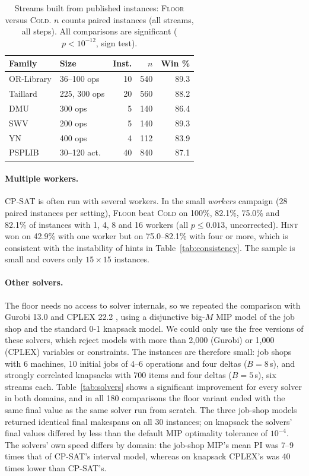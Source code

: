 \documentclass[letterpaper]{article} %
\newcommand{\mcold}{\textsc{Cold}}
\newcommand{\mhint}{\textsc{Hint}}
\newcommand{\mfloor}{\textsc{Floor}}
\begin{document}
\begin{table}[t]
\centering
\small
\setlength{\tabcolsep}{4pt}
\begin{tabular}{llrrr}
\toprule
Family & Size & Inst. & $n$ & Win \% \\
\midrule
OR-Library & 36--100 ops & 10 & 540 & 89.3 \\
Taillard & 225, 300 ops & 20 & 560 & 88.2 \\
DMU & 300 ops & 5 & 140 & 86.4 \\
SWV & 200 ops & 5 & 140 & 89.3 \\
YN & 400 ops & 4 & 112 & 83.9 \\
PSPLIB & 30--120 act. & 40 & 840 & 87.1 \\
\bottomrule
\end{tabular}
\caption{Streams built from published instances: \mfloor{} versus \mcold. $n$ counts paired instances (all streams, all steps). All comparisons are significant ($p < 10^{-12}$, sign test).}
\label{tab:real}
\end{table}

\paragraph{Multiple workers.} CP-SAT is often run with several workers. In the small \emph{workers} campaign (28 paired instances per setting), \mfloor{} beat \mcold{} on 100\%, 82.1\%, 75.0\% and 82.1\% of instances with 1, 4, 8 and 16 workers (all $p \le 0.013$, uncorrected). \mhint{} won on 42.9\% with one worker but on 75.0--82.1\% with four or more, which is consistent with the instability of hints in Table~\ref{tab:consistency}. The sample is small and covers only $15{\times}15$ instances.

\paragraph{Other solvers.} The floor needs no access to solver internals, so we repeated the comparison with Gurobi 13.0 \citep{gurobi} and CPLEX 22.2 \citep{cplex}, using a disjunctive big-$M$ MIP model of the job shop \citep{manne1960,ku2016} and the standard 0-1 knapsack model. We could only use the free versions of these solvers, which reject models with more than 2{,}000 (Gurobi) or 1{,}000 (CPLEX) variables or constraints. The instances are therefore small: job shops with 6 machines, 10 initial jobs of 4--6 operations and four deltas ($B=8$\,s), and strongly correlated knapsacks with 700 items and four deltas ($B=5$\,s), six streams each. Table~\ref{tab:solvers} shows a significant improvement for every solver in both domains, and in all 180 comparisons the floor variant ended with the same final value as the same solver run from scratch. The three job-shop models returned identical final makespans on all 30 instances; on knapsack the solvers' final values differed by less than the default MIP optimality tolerance of $10^{-4}$. The solvers' own speed differs by domain: the job-shop MIP's mean PI was 7--9 times that of CP-SAT's interval model, whereas on knapsack CPLEX's was 40 times lower than CP-SAT's.
\end{document}
